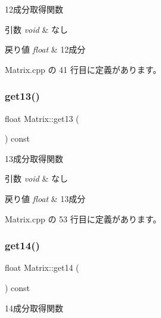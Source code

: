 12成分取得関数 


\begin{DoxyParams}{引数}
{\em void} & なし \\
\hline
\end{DoxyParams}

\begin{DoxyRetVals}{戻り値}
{\em float} & 12成分 \\
\hline
\end{DoxyRetVals}


 Matrix.\+cpp の 41 行目に定義があります。

\mbox{\label{class_matrix_a921bc8b3e2f3e373fe2728075caf462f}} 
\subsubsection{\texorpdfstring{get13()}{get13()}}
{\footnotesize\ttfamily float Matrix\+::get13 (\begin{DoxyParamCaption}{ }\end{DoxyParamCaption}) const}



13成分取得関数 


\begin{DoxyParams}{引数}
{\em void} & なし \\
\hline
\end{DoxyParams}

\begin{DoxyRetVals}{戻り値}
{\em float} & 13成分 \\
\hline
\end{DoxyRetVals}


 Matrix.\+cpp の 53 行目に定義があります。

\mbox{\label{class_matrix_a2e5886125fced6427695c51f99bfbd98}} 
\subsubsection{\texorpdfstring{get14()}{get14()}}
{\footnotesize\ttfamily float Matrix\+::get14 (\begin{DoxyParamCaption}{ }\end{DoxyParamCaption}) const}



14成分取得関数 


